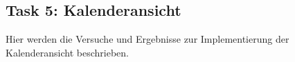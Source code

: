 \subsection{Task 5: Kalenderansicht}
\label{subsec:results_t5}

Hier werden die Versuche und Ergebnisse zur Implementierung der Kalenderansicht beschrieben.

%
